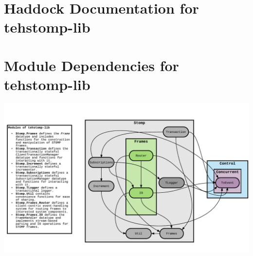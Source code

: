 \documentclass[conference, letterpaper]{IEEEtran}
\begin{document}



\begin{appendices}

\clearpage
\section{Haddock Documentation for tehstomp-lib}

\ifCLASSINFOpdf
    
    
\else
\fi

\section{Module Dependencies for tehstomp-lib}

\ifCLASSINFOpdf
    \includegraphics[scale=.8]{dependencies.pdf}
\else
\fi


\end{appendices}
\end{document}
